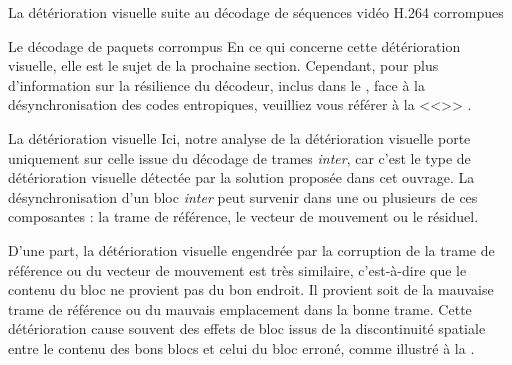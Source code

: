 \begin{chapter}{La détérioration visuelle suite au décodage de séquences vidéo H.264 corrompues}
\begin{section}{Le décodage de paquets corrompus}
En ce qui concerne cette détérioration visuelle, elle est le sujet de la
prochaine section. Cependant, pour plus d'information sur la résilience du
décodeur, inclus dans le \ltCodec, face à la désynchronisation des codes
entropiques, veuilliez vous référer à la 
<<>> .
\end{section}

\begin{section}{La détérioration visuelle}
\label{sect-deterioration}
Ici, notre analyse de la détérioration visuelle porte uniquement
sur celle issue du décodage de trames \textit{inter}, car c'est le type de
détérioration visuelle détectée par la solution proposée dans cet ouvrage. La
désynchronisation d'un bloc \textit{inter} peut survenir dans une ou
plusieurs de ces composantes : la trame de référence, le vecteur de mouvement ou
le résiduel.

D'une part, la détérioration visuelle engendrée par la corruption de la trame de
référence ou du vecteur de mouvement est très similaire, c'est-à-dire que le
contenu du bloc ne provient pas du bon endroit. Il provient soit de la mauvaise
trame de référence ou du mauvais emplacement dans la bonne trame. Cette
détérioration cause souvent des effets de bloc issus de la discontinuité
spatiale entre le contenu des bons blocs et celui du bloc erroné, comme illustré
à la .


\end{section}
\end{chapter}
